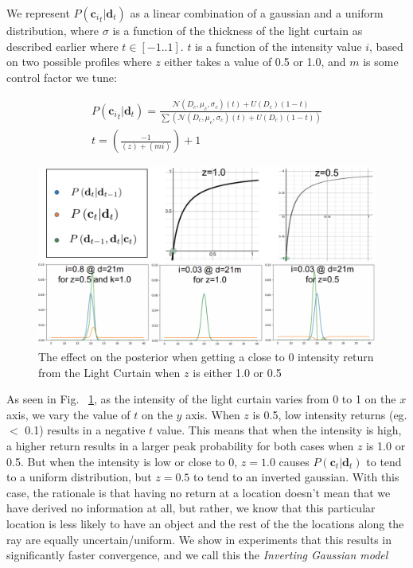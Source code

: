 We represent $P\left(\mathbf{c_{\mathit{i}}}_{t}|\mathbf{d}_{t}\right)$ as a linear combination of a gaussian and a uniform distribution, where $\sigma$ is a function of the thickness of the light curtain as described earlier where $t\in[-1..1]$. $t$ is a function of the intensity value $i$, based on two possible profiles where $z$ either takes a value of 0.5 or 1.0, and $m$ is some control factor we tune:

\small
\begin{align}
   P\left(\mathbf{c_{\mathit{i}}}_{t}|\mathbf{d}_{t}\right)=\frac{\mathcal{N}\left(D_{c},\mu_{c},\sigma_{c}\right)\left(t\right)+U\left(D_{c}\right)(1-t)}{\sum\left(\mathcal{N}\left(D_{c},\mu_{c},\sigma_{c}\right)\left(t\right)+U\left(D_{c}\right)(1-t)\right)} \\
   t=\left(\frac{-1}{\left(z\right)+\left(mi\right)}\right)+1
   \label{eq:dist}
\end{align}
\normalsize

\begin{figure}[h]
   \centering
   \begin{minipage}{0.5\textwidth}
       \centering
       \includegraphics[width=1.0\textwidth]{figures/graphs.png}
   \end{minipage}\hfill
   \centering
   \caption{The effect on the posterior when getting a close to 0 intensity return from the Light Curtain when $z$ is either 1.0 or 0.5}
   \label{fig:updatemodel}
\end{figure}

As seen in Fig. ~\ref{fig:updatemodel}, as the intensity of the light curtain varies from 0 to 1 on the $x$ axis, we vary the value of $t$ on the $y$ axis. When $z$ is 0.5, low intensity returns (eg. $<$ 0.1) results in a negative $t$ value. This means that when the intensity is high, a higher return results in a larger peak probability for both cases when $z$ is 1.0 or 0.5. But when the intensity is low or close to 0, $z=1.0$ causes $P\left(\mathbf{c}_{t}|\mathbf{d}_{t}\right)$ to tend to a uniform distribution, but $z=0.5$ to tend to an inverted gaussian. With this case, the rationale is that having no return at a location doesn't mean that we have derived no information at all, but rather, we know that this particular location is less likely to have an object and the rest of the the locations along the ray are equally uncertain/uniform. We show in experiments that this results in significantly faster convergence, and we call this the \textit{Inverting Gaussian model}